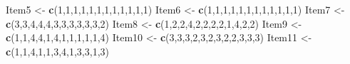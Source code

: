 \documentclass[
  english,
]{book}
\newenvironment{Shaded}{\begin{snugshade}}{\end{snugshade}}
\newcommand{\DecValTok}[1]{\textcolor[rgb]{0.00,0.00,0.81}{#1}}
\newcommand{\KeywordTok}[1]{\textcolor[rgb]{0.13,0.29,0.53}{\textbf{#1}}}
\newcommand{\NormalTok}[1]{#1}
\newcommand{\StringTok}[1]{\textcolor[rgb]{0.31,0.60,0.02}{#1}}
\begin{document}
\begin{Shaded}
\begin{Highlighting}[]
\NormalTok{Item5 <-}\StringTok{ }\KeywordTok{c}\NormalTok{(}\DecValTok{1}\NormalTok{,}\DecValTok{1}\NormalTok{,}\DecValTok{1}\NormalTok{,}\DecValTok{1}\NormalTok{,}\DecValTok{1}\NormalTok{,}\DecValTok{1}\NormalTok{,}\DecValTok{1}\NormalTok{,}\DecValTok{1}\NormalTok{,}\DecValTok{1}\NormalTok{,}\DecValTok{1}\NormalTok{,}\DecValTok{1}\NormalTok{,}\DecValTok{1}\NormalTok{)}
\NormalTok{Item6 <-}\StringTok{ }\KeywordTok{c}\NormalTok{(}\DecValTok{1}\NormalTok{,}\DecValTok{1}\NormalTok{,}\DecValTok{1}\NormalTok{,}\DecValTok{1}\NormalTok{,}\DecValTok{1}\NormalTok{,}\DecValTok{1}\NormalTok{,}\DecValTok{1}\NormalTok{,}\DecValTok{1}\NormalTok{,}\DecValTok{1}\NormalTok{,}\DecValTok{1}\NormalTok{,}\DecValTok{1}\NormalTok{,}\DecValTok{1}\NormalTok{)}
\NormalTok{Item7 <-}\StringTok{ }\KeywordTok{c}\NormalTok{(}\DecValTok{3}\NormalTok{,}\DecValTok{3}\NormalTok{,}\DecValTok{4}\NormalTok{,}\DecValTok{4}\NormalTok{,}\DecValTok{4}\NormalTok{,}\DecValTok{3}\NormalTok{,}\DecValTok{3}\NormalTok{,}\DecValTok{3}\NormalTok{,}\DecValTok{3}\NormalTok{,}\DecValTok{3}\NormalTok{,}\DecValTok{3}\NormalTok{,}\DecValTok{2}\NormalTok{)}
\NormalTok{Item8 <-}\StringTok{ }\KeywordTok{c}\NormalTok{(}\DecValTok{1}\NormalTok{,}\DecValTok{2}\NormalTok{,}\DecValTok{2}\NormalTok{,}\DecValTok{4}\NormalTok{,}\DecValTok{2}\NormalTok{,}\DecValTok{2}\NormalTok{,}\DecValTok{2}\NormalTok{,}\DecValTok{2}\NormalTok{,}\DecValTok{1}\NormalTok{,}\DecValTok{4}\NormalTok{,}\DecValTok{2}\NormalTok{,}\DecValTok{2}\NormalTok{)}
\NormalTok{Item9 <-}\StringTok{ }\KeywordTok{c}\NormalTok{(}\DecValTok{1}\NormalTok{,}\DecValTok{1}\NormalTok{,}\DecValTok{4}\NormalTok{,}\DecValTok{4}\NormalTok{,}\DecValTok{1}\NormalTok{,}\DecValTok{4}\NormalTok{,}\DecValTok{1}\NormalTok{,}\DecValTok{1}\NormalTok{,}\DecValTok{1}\NormalTok{,}\DecValTok{1}\NormalTok{,}\DecValTok{1}\NormalTok{,}\DecValTok{4}\NormalTok{)}
\NormalTok{Item10 <-}\StringTok{ }\KeywordTok{c}\NormalTok{(}\DecValTok{3}\NormalTok{,}\DecValTok{3}\NormalTok{,}\DecValTok{3}\NormalTok{,}\DecValTok{2}\NormalTok{,}\DecValTok{3}\NormalTok{,}\DecValTok{2}\NormalTok{,}\DecValTok{3}\NormalTok{,}\DecValTok{2}\NormalTok{,}\DecValTok{2}\NormalTok{,}\DecValTok{3}\NormalTok{,}\DecValTok{3}\NormalTok{,}\DecValTok{3}\NormalTok{)}
\NormalTok{Item11 <-}\StringTok{ }\KeywordTok{c}\NormalTok{(}\DecValTok{1}\NormalTok{,}\DecValTok{1}\NormalTok{,}\DecValTok{4}\NormalTok{,}\DecValTok{1}\NormalTok{,}\DecValTok{1}\NormalTok{,}\DecValTok{3}\NormalTok{,}\DecValTok{4}\NormalTok{,}\DecValTok{1}\NormalTok{,}\DecValTok{3}\NormalTok{,}\DecValTok{3}\NormalTok{,}\DecValTok{1}\NormalTok{,}\DecValTok{3}\NormalTok{)}

\end{Highlighting}
\end{Shaded}
\end{document}

